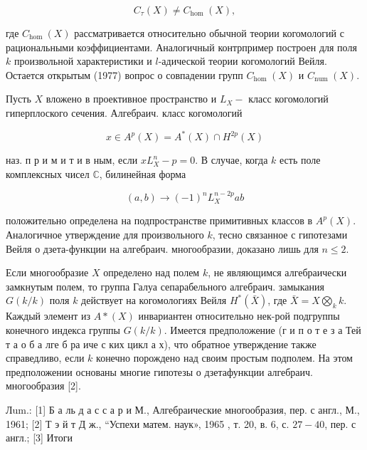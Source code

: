 \documentclass[10pt]{article}
\begin{document}
\[

C_{\tau}(X) \neq C_{\text {hom }}(X),

\]



где $C_{\text {hom }}(X)$ рассматривается относительно обычной теории когомологий с рациональными коэффициентами. Аналогичный контрпример построен для поля $k$ произвольной характеристики и $l$-адической теории когомологий Вейля. Остается открытым (1977) вопрос о совпадении групп $C_{\text {hom }}(X)$ и $C_{\text {num }}(X)$.



Пусть $X$ вложено в проективное пространство и $L_{X}-$ класс когомологий гиперплоского сечения. Алгебраич. класс когомологий



\[

x \in A^{p}(X)=A^{*}(X) \cap H^{2 p}(X)

\]



наз. п р и м и т и в ным, если $x L_{X}^{n}-p=0$. В случае, когда $k$ есть поле комплексных чисел $\mathbb{C}$, билинейная форма



\[

(a, b) \longrightarrow(-1)^{n} L_{X}^{n-2 p} a b

\]



положительно определена на подпространстве примитивных классов в $A^{p}(X)$. Аналогичное утверждение для произвольного $k$, тесно связанное с гипотезами Вейля о дзета-функции на алгебраич. многообразии, доказано лишь для $n \leqslant 2$.



Если многообразие $X$ определено над полем $k$, не являющимся алгебраически замкнутым полем, то группа Галуа сепарабельного алгебраич. замыкания $G(k / k)$ поля $k$ действует на когомологиях Вейля $H^{*}(\bar{X})$, где $\bar{X}=X \underset{k}{\bigotimes} k$. Каждый элемент из $A *(X)$ инвариантен относительно нек-рой подгруппы конечного индекса группы $G(k / k)$. Имеется предположение (г и п о т е з а Тей т а о б а лге б ра иче с ких цикл а х), что обратное утверждение также справедливо, если $k$ конечно порождено над своим простым подполем. На этом предположении основаны многие гипотезы о дзетафункции алгебраич. многообразия [2].



Лum.: [1] Б а ль д а с с а р и М., Алгебраические многообразия, пер. с англ., М., 1961; [2] Т э й т Д ж., “Успехи матем. наук», 1965 , т. 20, в. 6, с. $27-40$, пер. с англ.; [3] Итоги
\end{document}

